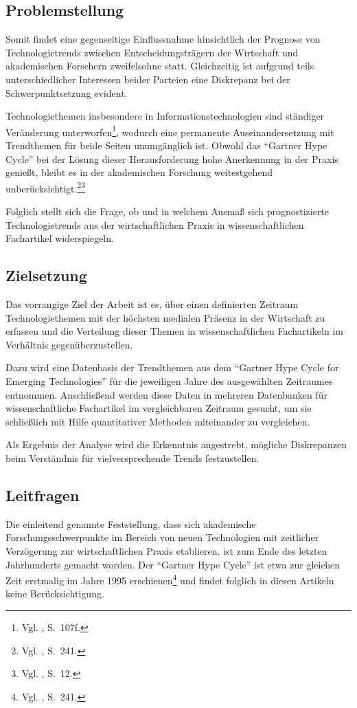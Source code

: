 \subsection{Problemstellung}
Somit findet eine gegenseitige Einflussnahme hinsichtlich der Prognose von Technologietrends zwischen Entscheidungsträgern der Wirtschaft und akademischen Forschern zweifelsohne statt. Gleichzeitig ist aufgrund teils unterschiedlicher Interessen beider Parteien eine Diskrepanz bei der Schwerpunktsetzung evident. 

Technologiethemen insbesondere in Informationstechnologien sind ständiger Ver\-änderung unterworfen\footnote{Vgl. , S.~107f.}, wodurch eine permanente Auseinandersetzung mit Trend\-themen für beide Seiten unumgänglich ist. Obwohl das "`Gartner Hype Cycle"' bei der Lösung dieser Herausforderung hohe Anerkennung in der Praxis genießt, bleibt es in der akademischen Forschung weitestgehend unberücksichtigt.\footnote{Vgl. , S.~241.}\footnote{Vgl. , S.~12.}

Folglich stellt sich die Frage, ob und in welchem Ausmaß sich prognostizierte Technologietrends aus der wirtschaftlichen Praxis in wissenschaftlichen Fachartikel widerspiegeln.

\subsection{Zielsetzung}
Das vorrangige Ziel der Arbeit ist es, über einen definierten Zeitraum Technologiethemen mit der höchsten medialen Präsenz in der Wirtschaft zu erfassen und die Verteilung dieser Themen in wissenschaftlichen Fachartikeln im Verhältnis gegenüberzustellen.

Dazu wird eine Datenbasis der Trendthemen aus dem "`Gartner Hype Cycle for Emerging Technologies"' für die jeweiligen Jahre des ausgewählten Zeitraumes entnommen. Anschließend werden diese Daten in mehreren Datenbanken für wissenschaftliche Fachartikel im vergleichbaren Zeitraum gesucht, um sie schließlich mit Hilfe quantitativer Methoden miteinander zu vergleichen.

Als Ergebnis der Analyse wird die Erkenntnis angestrebt, mögliche Diskrepanzen beim Verständnis für vielversprechende Trends festzustellen.

\subsection{Leitfragen}
Die einleitend genannte Feststellung, dass sich akademische Forschungsschwerpunkte im Bereich von neuen Technologien mit zeitlicher Verzögerung zur wirtschaftlichen Praxis etablieren, ist zum Ende des letzten Jahrhunderts gemacht worden. Der "`Gartner Hype Cycle"' ist etwa zur gleichen Zeit erstmalig im Jahre 1995 erschienen\footnote{Vgl. , S.~241.} und findet folglich in diesen Artikeln keine Berücksichtigung.

